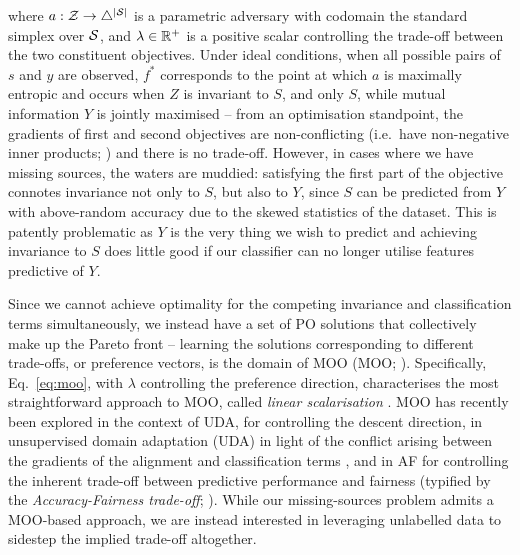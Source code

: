 %
where \( a: {\mathcal{Z}} \to \bigtriangleup^{|{\mathcal{S}}|} \) is a parametric adversary with codomain the standard
simplex over \( {\mathcal{S}} \), and \(\lambda \in \mathbb{R}^+\) is a positive scalar controlling the trade-off
between the two constituent objectives. 
%
Under ideal conditions, when all possible pairs of \(s\) and \(y\) are observed, \(f^\ast\)
corresponds to the point at which \(a\) is maximally entropic and occurs when \(Z\) is invariant to
\(S\), and only \(S\), while mutual information \wrt{} \(Y\) is jointly maximised -- from an
optimisation standpoint, the gradients of first and second objectives are non-conflicting (i.e.\
have non-negative inner products; \citealp{yu2020gradient}) and there is no trade-off. 
%
However, in cases where we have missing sources, the waters are muddied: satisfying the first part
of the objective connotes invariance not only to \(S\), but also to \(Y\), since \(S\) can be
predicted from \(Y\) with above-random accuracy due to the skewed statistics of the dataset. 
%
This is patently problematic as \(Y\) is the very thing we wish to predict and achieving invariance
to \(S\) does little good if our classifier can no longer utilise features predictive of \(Y\). 

Since we cannot achieve optimality for the competing invariance and classification terms
simultaneously, we instead have a set of \ac{PO} solutions that collectively make up the Pareto
front -- learning the solutions corresponding to different trade-offs, or preference vectors, is
the domain of \acl{MOO} (\acs{MOO}; \citealp{deb2014multi}). 
%
Specifically, Eq.~\ref{eq:moo}, with \(\lambda\) controlling the preference direction,
characterises the most straightforward approach to MOO, called \emph{linear scalarisation}
\citep{boyd2004convex}. 
%
\Ac{MOO} has recently been explored in the context of \ac{UDA}, for controlling the descent
direction, in unsupervised domain adaptation (UDA) in light of the conflict arising between the
gradients of the alignment and classification terms \citep{liang2021pareto}, and in \acf{AF} for
controlling the inherent trade-off between predictive performance and fairness (typified by the
\emph{Accuracy-Fairness trade-off}; \citet{martinez2020minimax}).
%
While our missing-sources problem admits a \acs{MOO}-based approach, we are instead interested in
leveraging unlabelled data to sidestep the implied trade-off altogether.
